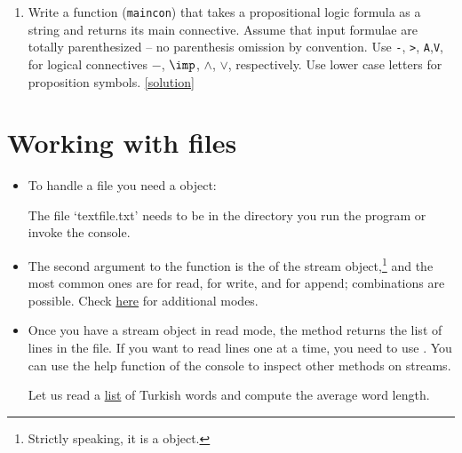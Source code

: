 \documentclass[a4paper]{article}
\begin{document}
{\begin{uexercise}
\begin{enumerate}
\item
Write a function (\Verb+maincon+) that takes a propositional logic formula as a
string and returns its main connective. Assume that input formulae 
are totally parenthesized -- no parenthesis omission by convention. Use
\Verb+-+, \Verb+>+, \Verb+A+,\Verb+V+, for logical connectives $-$, $\imp$,
$\land$, $\lor$, respectively. Use lower case letters for proposition symbols. 
\href{https://github.com/umutozge/prog-book/blob/master/code/maincon.py}{[solution]}

\end{enumerate}
\end{uexercise}

\section{Working with files}

\begin{itemize}
\item To handle a file you need a
 object:

\begin{ucodeframe}
\end{ucodeframe}

The file `textfile.txt' needs to be in the directory you run the program or invoke
the console.  

\item The second argument to the function  is the  of
the stream object,\footnote{Strictly speaking, it is a  object.}
 and the most common ones are  for read,  for write,
and  for append; combinations are possible.  Check
\href{https://docs.python.org/3/library/functions.html#open}{here} for
additional modes.

\item Once you have a stream object in read mode, the method 
returns the list of lines in the file. If you want to read lines one at a time,
you need to use . You can use the help function of the console
to inspect other methods on streams.

\begin{uexample}\label{filei} Let us read a
\href{https://github.com/umutozge/prog-book/blob/master/code/tr-word-list.txt}{list}
of Turkish words and compute the average word length.

\begin{ucodeframe}
\end{ucodeframe}


\end{uexample}
\end{itemize}}
\end{document}
